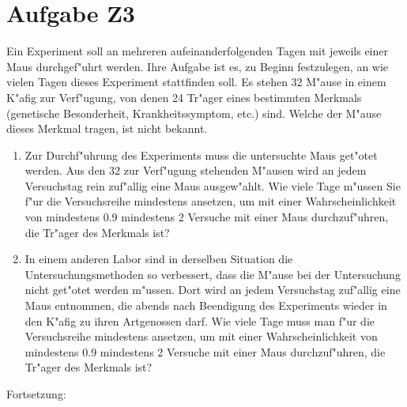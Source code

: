\section{Aufgabe Z3}

Ein Experiment soll an mehreren aufeinanderfolgenden Tagen mit jeweils einer Maus durchgef"uhrt werden. Ihre Aufgabe ist es, zu Beginn festzulegen, an wie vielen Tagen dieses Experiment stattfinden soll. Es stehen 32 M"ause in einem K"afig zur Verf"ugung, von denen 24 Tr"ager eines bestimmten Merkmals (genetische Besonderheit, Krankheitssymptom, etc.) sind. Welche der M"ause dieses Merkmal tragen, ist nicht bekannt.

\begin{enumerate}[leftmargin=1cm, label=\alph*)]
	\item Zur Durchf"uhrung des Experiments muss die untersuchte Maus get"otet werden. Aus den 32 zur Verf"ugung stehenden M"ausen wird an jedem Versuchstag rein zuf"allig eine Maus ausgew"ahlt. Wie viele Tage m"ussen Sie f"ur die Versuchsreihe mindestens ansetzen, um mit einer Wahrscheinlichkeit von mindestens 0.9 mindestens 2 Versuche mit einer Maus durchzuf"uhren, die Tr"ager des Merkmals ist?
	
	\item In einem anderen Labor sind in derselben Situation die Untersuchungsmethoden so verbessert, dass die M"ause bei der Untersuchung nicht get"otet werden m"ussen. Dort wird an jedem Versuchstag zuf"allig eine Maus entnommen, die abends nach Beendigung des Experiments wieder in den K"afig zu ihren Artgenossen darf. Wie viele Tage muss man f"ur die Versuchsreihe mindestens ansetzen, um mit einer Wahrscheinlichkeit von mindestens 0.9 mindestens 2 Versuche mit einer Maus durchzuf"uhren, die Tr"ager des Merkmals ist?
\end{enumerate}

\newpage
Fortsetzung: